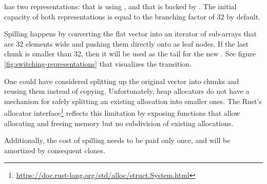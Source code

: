 \pvec{} has two representations:  that is using \stdvec{}, and  that is backed by \rrbvec{}. The initial capacity of both representations is equal to the branching factor of 32 by default.

Spilling happens by converting the flat vector into an iterator of sub-arrays that are 32 elements wide and pushing them directly onto \rrbtree{} as leaf nodes. If the last chunk is smaller than 32, then it will be used as the tail for the new \rrbvec{}. See figure \ref{fig:switching-representations} that visualizes the transition.

One could have considered splitting up the original vector into chunks and reusing them instead of copying. Unfortunately, heap allocators do not have a mechanism for safely splitting an existing allocation into smaller ones. The Rust's allocator interface\footnote{\url{https://doc.rust-lang.org/std/alloc/struct.System.html}} reflects this limitation by exposing functions that allow allocating and freeing memory but no subdivision of existing allocations.

Additionally, the cost of spilling needs to be paid only once, and will be amortized by  consequent clones.

